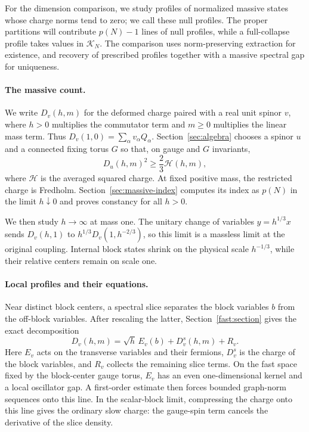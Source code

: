 For the dimension comparison, we study profiles of normalized massive
states whose charge norms tend to zero; we call these null profiles.
The proper partitions will contribute $p(N)-1$ lines of null profiles, while
a full-collapse profile takes values in $\mathcal K_N$. The comparison
uses norm-preserving extraction for existence, and recovery of prescribed
profiles together with a massive spectral gap for uniqueness.

\paragraph{The massive count.}
We write $D_v(h,m)$ for the deformed charge paired with a real unit
spinor $v$, where $h>0$ multiplies the commutator term and $m\ge0$
multiplies the linear mass term. Thus
$D_v(1,0)=\sum_\alpha v_\alpha Q_\alpha$.
Section~\ref{sec:algebra} chooses a spinor $u$ and a connected fixing
torus $G$ so that, on gauge and $G$ invariants,
\[
 D_u(h,m)^2\ge\frac23\mathcal H(h,m),
\]
where $\mathcal H$ is the averaged squared charge. At fixed positive mass,
the restricted charge is Fredholm. Section~\ref{sec:massive-index}
computes its index as $p(N)$ in the limit $h\downarrow0$ and proves
constancy for all $h>0$.

We then study $h\to\infty$ at mass one. The unitary change of variables
$y=h^{1/3}x$ sends $D_v(h,1)$ to
$h^{1/3}D_v(1,h^{-2/3})$, so this limit is a massless limit at the original
coupling. Internal block states shrink on the physical scale $h^{-1/3}$,
while their relative centers remain on scale one.

\paragraph{Local profiles and their equations.}
Near distinct block centers, a spectral slice separates the block
variables $b$ from the off-block variables. After rescaling the latter,
Section~\ref{fast:section} gives the exact decomposition
\[
 D_v(h,m)=\sqrt h\,E_v(b)+D_v^s(h,m)+R_v.
\]
Here $E_v$ acts on the transverse variables and their fermions,
$D_v^s$ is the charge of the block variables, and $R_v$ collects the
remaining slice terms. On the fast space fixed
by the block-center gauge torus, $E_v$ has an even one-dimensional
kernel and a local oscillator gap. A first-order estimate then forces
bounded graph-norm sequences onto this line. In the scalar-block limit,
compressing the charge onto this line gives the ordinary slow charge:
the gauge-spin term cancels the derivative of
the slice density.

